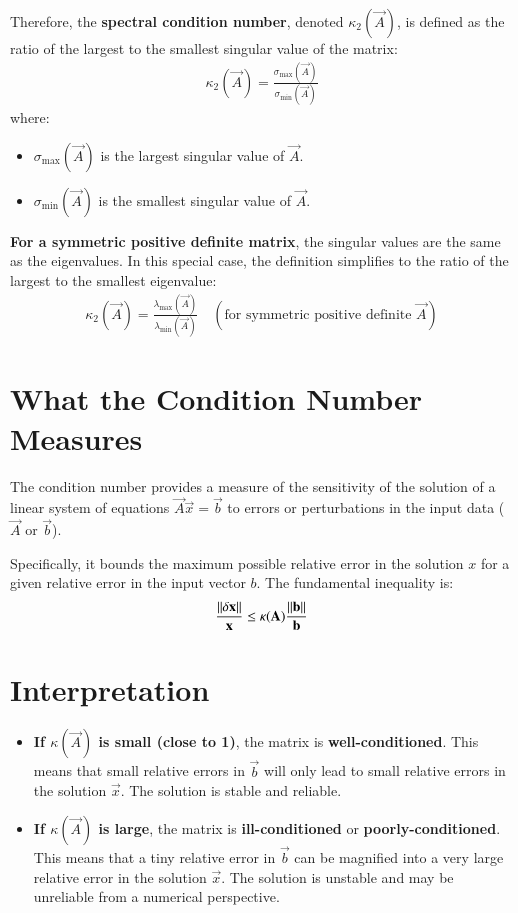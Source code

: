 \documentclass[journal]{IEEEtran}
\begin{document}
Therefore, the \textbf{spectral condition number}, denoted $\kappa_2(\vec{A})$, is defined as the ratio of the largest to the smallest singular value of the matrix:
\begin{align}
\kappa_2(\vec{A}) = \frac{\sigma_{\text{max}}(\vec{A})}{\sigma_{\text{min}}(\vec{A})}
\end{align}
where:
\begin{itemize}
    \item $\sigma_{\text{max}}(\vec{A})$ is the largest singular value of $\vec{A}$.
    \item $\sigma_{\text{min}}(\vec{A})$ is the smallest singular value of $\vec{A}$.
\end{itemize}

\textbf{For a symmetric positive definite matrix}, the singular values are the same as the eigenvalues. In this special case, the definition simplifies to the ratio of the largest to the smallest eigenvalue:
\begin{align}
\kappa_2(\vec{A}) = \frac{\lambda_{\text{max}}(\vec{A})}{\lambda_{\text{min}}(\vec{A})} \quad (\text{for symmetric positive definite } \vec{A})
\end{align}


\section*{What the Condition Number Measures}

The condition number provides a measure of the sensitivity of the solution of a linear system of equations $\vec{A}\vec{x} = \vec{b}$ to errors or perturbations in the input data ($\vec{A}$ or $\vec{b}$).

Specifically, it bounds the maximum possible relative error in the solution $x$ for a given relative error in the input vector $b$. The fundamental inequality is:
\begin{align}
\frac{\left\lVert\delta \mathbf{x}\right\rVert}{\mathbf{x}} \le \kappa(\mathbf{A}) \frac{\left\lVert\mathbf{b}\right\rVert}{\mathbf{b}}
\end{align}

\section*{Interpretation}
\begin{itemize}
    \item \textbf{If $\kappa(\vec{A})$ is small (close to 1)}, the matrix is \textbf{well-conditioned}. This means that small relative errors in $\vec{b}$ will only lead to small relative errors in the solution $\vec{x}$. The solution is stable and reliable.
    \item \textbf{If $\kappa(\vec{A})$ is large}, the matrix is \textbf{ill-conditioned} or \textbf{poorly-conditioned}. This means that a tiny relative error in $\vec{b}$ can be magnified into a very large relative error in the solution $\vec{x}$. The solution is unstable and may be unreliable from a numerical perspective.
\end{itemize}\\
\bigskip
\end{document}

